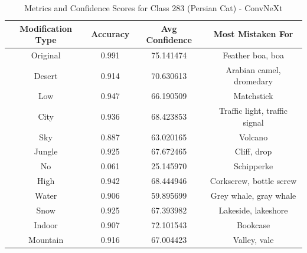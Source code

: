 \begin{table}
	\centering
	\begin{tabular}{|c|c|c|c|}
		\hline
		\textbf{Modification Type} & \textbf{Accuracy} & \textbf{Avg Confidence} & \textbf{Most Mistaken For} \\
		\hline
		Original & 0.991 & 75.141474 & Feather boa, boa \\
		\hline
		Desert & 0.914 & 70.630613 & Arabian camel, dromedary \\
		\hline
		Low & 0.947 & 66.190509 & Matchstick \\
		\hline
		City & 0.936 & 68.423853 & Traffic light, traffic signal \\
		\hline
		Sky & 0.887 & 63.020165 & Volcano \\
		\hline
		Jungle & 0.925 & 67.672465 & Cliff, drop \\
		\hline
		No & 0.061 & 25.145970 & Schipperke \\
		\hline
		High & 0.942 & 68.444946 & Corkscrew, bottle screw \\
		\hline
		Water & 0.906 & 59.895699 & Grey whale, gray whale \\
		\hline
		Snow & 0.925 & 67.393982 & Lakeside, lakeshore \\
		\hline
		Indoor & 0.907 & 72.101543 & Bookcase \\
		\hline
		Mountain & 0.916 & 67.004423 & Valley, vale \\
		\hline
	\end{tabular}
	\caption{Metrics and Confidence Scores for Class 283 (Persian Cat) - ConvNeXt}
	\label{tab:metrics_confidence_class_283_convnext}
\end{table}

